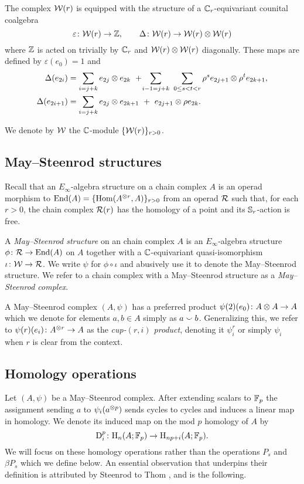 The complex $\mathcal{W}(r)$ is equipped with the structure of a $\mathbb{C}_r$-equivariant counital coalgebra
\[
\varepsilon \colon \mathcal{W}(r) \to \mathbb{Z}, \qquad
\Delta \colon \mathcal{W}(r) \to \mathcal{W}(r) \otimes \mathcal{W}(r)
\]
where $\mathbb{Z}$ is acted on trivially by $\mathbb{C}_r$ and $\mathcal{W}(r) \otimes \mathcal{W}(r)$ diagonally.
These maps are defined by $\varepsilon(e_0) = 1$ and
\begin{align*}
	\Delta(e_{2i}) &=
	\sum_{i=j+k} e_{2j} \otimes e_{2k} \ + \! \sum_{i-1=j+k} \ \sum_{0 \leq s < t < r} \rho^s e_{2j+1} \otimes \rho^t e_{2k+1}, \\
	\Delta(e_{2i+1}) &=
	\sum_{i=j+k} e_{2j} \otimes e_{2k+1} \ +\ e_{2j+1} \otimes \rho e_{2k}.
\end{align*}

We denote by $\mathcal{W}$ the $\mathbb{C}$-module $\{\mathcal{W}(r)\}_{r > 0}$.

\subsection{May--Steenrod structures}

Recall that an $E_\infty$-algebra structure on a chain complex $A$ is an operad morphism to $\mathrm{End}(A) = \{\mathrm{Hom}(A^{\otimes r}, A)\}_{r>0}$ from an operad $\mathcal{R}$ such that, for each $r > 0$, the chain complex $\mathcal{R}(r)$ has the homology of a point and its $\mathbb{S}_r$-action is free.

A \textit{May--Steenrod structure} on an chain complex $A$ is an $E_\infty$-algebra structure $\phi \colon \mathcal{R} \to \mathrm{End}(A)$ on $A$ together with a $\mathbb{C}$-equivariant quasi-isomorphism $\iota \colon \mathcal{W} \to \mathcal{R}$.
We write $\psi$ for $\phi \circ \iota$ and abusively use it to denote the May--Steenrod structure.
We refer to a chain complex with a May--Steenrod structure as a \textit{May--Steenrod complex}.

A May--Steenrod complex $(A,\psi)$ has a preferred product $\psi(2)(e_0) \colon A \otimes A \to A$ which we denote for elements $a, b \in A$ simply as $a \smallsmile b$.
Generalizing this, we refer to $\psi(r)(e_i) \colon A^{\otimes r} \to A$ as the \textit{cup-$(r,i)$ product}, denoting it $\psi_i^r$ or simply $\psi_i$ when $r$ is clear from the context.

\subsection{Homology operations}\label{ss:homology_operations}

Let $(A,\psi)$ be a May--Steenrod complex.
After extending scalars to ${\mathbb{F}_p}$ the assignment sending $a$ to $\psi_i(a^{\otimes p})$ sends cycles to cycles and induces a linear map in homology.
We denote its induced map on the mod $p$ homology of $A$ by
\begin{equation}\label{e:D_i^p}
	\mathrm{D}_i^p \colon \mathrm{H}_n(A; {\mathbb{F}_p}) \to \mathrm{H}_{np+i}(A; {\mathbb{F}_p}).
\end{equation}
We will focus on these homology operations rather than the operations $P_s$ and $\beta P_s$ which we define below.
An essential observation that underpins their definition is attributed by Steenrod to Thom \cite[Theorem~4.8]{steenrod1947products}, and is the following.

